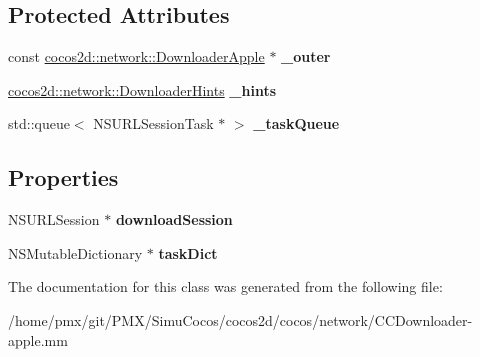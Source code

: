 \subsection*{Protected Attributes}
\begin{DoxyCompactItemize}
\item 
\mbox{\label{interfaceDownloaderAppleImpl_a0607b6d2865805da74a2ff7d3ec66ec0}} 
const \hyperlink{classcocos2d_1_1network_1_1DownloaderApple}{cocos2d\+::network\+::\+Downloader\+Apple} $\ast$ {\bfseries \+\_\+outer}
\item 
\mbox{\label{interfaceDownloaderAppleImpl_acb7eb92c334b7d07c6a10a202ecc009b}} 
\hyperlink{classcocos2d_1_1network_1_1DownloaderHints}{cocos2d\+::network\+::\+Downloader\+Hints} {\bfseries \+\_\+hints}
\item 
\mbox{\label{interfaceDownloaderAppleImpl_af40db62a99a9b1d1881f9e52f7c728c1}} 
std\+::queue$<$ N\+S\+U\+R\+L\+Session\+Task $\ast$ $>$ {\bfseries \+\_\+task\+Queue}
\end{DoxyCompactItemize}
\subsection*{Properties}
\begin{DoxyCompactItemize}
\item 
\mbox{\label{interfaceDownloaderAppleImpl_ab6477fdf0d789be2b4a93bdd85febd4b}} 
N\+S\+U\+R\+L\+Session $\ast$ {\bfseries download\+Session}
\item 
\mbox{\label{interfaceDownloaderAppleImpl_aab5b6119713c87440724179f64e05753}} 
N\+S\+Mutable\+Dictionary $\ast$ {\bfseries task\+Dict}
\end{DoxyCompactItemize}


The documentation for this class was generated from the following file\+:\begin{DoxyCompactItemize}
\item 
/home/pmx/git/\+P\+M\+X/\+Simu\+Cocos/cocos2d/cocos/network/C\+C\+Downloader-\/apple.\+mm\end{DoxyCompactItemize}
